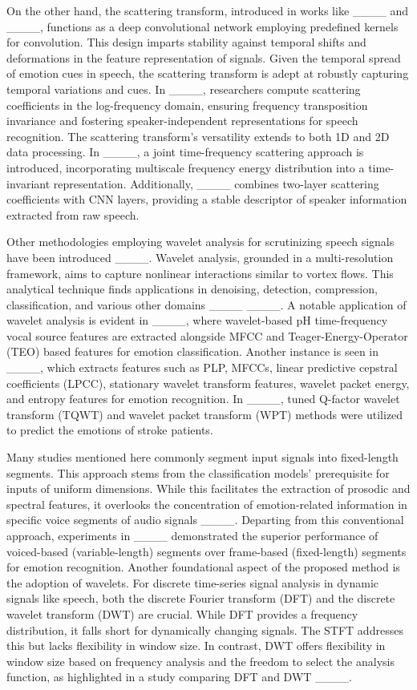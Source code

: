 On the other hand, the scattering transform, introduced in works like ____ and ____, functions as a deep convolutional network employing predefined kernels for convolution. This design imparts stability against temporal shifts and deformations in the feature representation of signals. Given the temporal spread of emotion cues in speech, the scattering transform is adept at robustly capturing temporal variations and cues. In ____, researchers compute scattering coefficients in the log-frequency domain, ensuring frequency transposition invariance and fostering speaker-independent representations for speech recognition. The scattering transform's versatility extends to both 1D and 2D data processing. In ____, a joint time-frequency scattering approach is introduced, incorporating multiscale frequency energy distribution into a time-invariant representation. Additionally, ____ combines two-layer scattering coefficients with CNN layers, providing a stable descriptor of speaker information extracted from raw speech.

Other methodologies employing wavelet analysis for scrutinizing speech signals have been introduced ____. Wavelet analysis, grounded in a multi-resolution framework, aims to capture nonlinear interactions similar to vortex flows. This analytical technique finds applications in denoising, detection, compression, classification, and various other domains ____ ____. A notable application of wavelet analysis is evident in ____, where wavelet-based pH time-frequency vocal source features are extracted alongside MFCC and Teager-Energy-Operator (TEO) based features for emotion classification. Another instance is seen in ____, which extracts features such as PLP, MFCCs, linear predictive cepstral coefficients (LPCC), stationary wavelet transform features, wavelet packet energy, and entropy features for emotion recognition. In ____, tuned Q-factor wavelet transform (TQWT) and wavelet packet transform (WPT) methods were utilized to predict the emotions of stroke patients.

Many studies mentioned here commonly segment input signals into fixed-length segments. This approach stems from the classification models' prerequisite for inputs of uniform dimensions. While this facilitates the extraction of prosodic and spectral features, it overlooks the concentration of emotion-related information in specific voice segments of audio signals ____. Departing from this conventional approach, experiments in ____ demonstrated the superior performance of voiced-based (variable-length) segments over frame-based (fixed-length) segments for emotion recognition. Another foundational aspect of the proposed method is the adoption of wavelets. For discrete time-series signal analysis in dynamic signals like speech, both the discrete Fourier transform (DFT) and the discrete wavelet transform (DWT) are crucial. While DFT provides a frequency distribution, it falls short for dynamically changing signals. The STFT addresses this but lacks flexibility in window size. In contrast, DWT offers flexibility in window size based on frequency analysis and the freedom to select the analysis function, as highlighted in a study comparing DFT and DWT ____.

